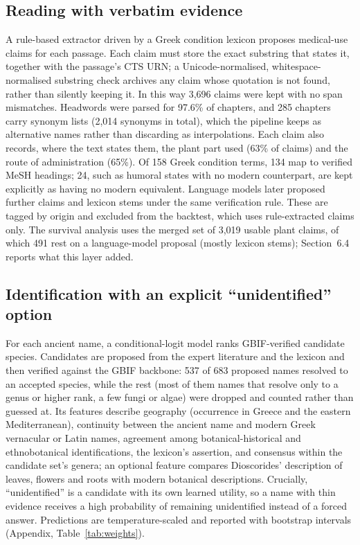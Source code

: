 \documentclass[11pt,a4paper]{article}
\begin{document}
\subsection{Reading with verbatim evidence}
A rule-based extractor driven by a Greek condition lexicon proposes medical-use claims for each passage. Each claim must store the exact substring that states it, together with the passage’s CTS URN; a Unicode-normalised, whitespace-normalised substring check archives any claim whose quotation is not found, rather than silently keeping it. In this way 3,696 claims were kept with no span mismatches. Headwords were parsed for 97.6\% of chapters, and 285 chapters carry synonym lists (2,014 synonyms in total), which the pipeline keeps as alternative names rather than discarding as interpolations. Each claim also records, where the text states them, the plant part used (63\% of claims) and the route of administration (65\%). Of 158 Greek condition terms, 134 map to verified MeSH headings; 24, such as humoral states with no modern counterpart, are kept explicitly as having no modern equivalent. Language models later proposed further claims and lexicon stems under the same verification rule. These are tagged by origin and excluded from the backtest, which uses rule-extracted claims only. The survival analysis uses the merged set of 3,019 usable plant claims, of which 491 rest on a language-model proposal (mostly lexicon stems); Section~6.4 reports what this layer added.

\subsection{Identification with an explicit “unidentified” option}
For each ancient name, a conditional-logit model ranks GBIF-verified candidate species. Candidates are proposed from the expert literature and the lexicon and then verified against the GBIF backbone: 537 of 683 proposed names resolved to an accepted species, while the rest (most of them names that resolve only to a genus or higher rank, a few fungi or algae) were dropped and counted rather than guessed at. Its features describe geography (occurrence in Greece and the eastern Mediterranean), continuity between the ancient name and modern Greek vernacular or Latin names, agreement among botanical-historical and ethnobotanical identifications, the lexicon’s assertion, and consensus within the candidate set’s genera; an optional feature compares Dioscorides’ description of leaves, flowers and roots with modern botanical descriptions. Crucially, “unidentified” is a candidate with its own learned utility, so a name with thin evidence receives a high probability of remaining unidentified instead of a forced answer. Predictions are temperature-scaled and reported with bootstrap intervals (Appendix, Table~\ref{tab:weights}).
\end{document}
